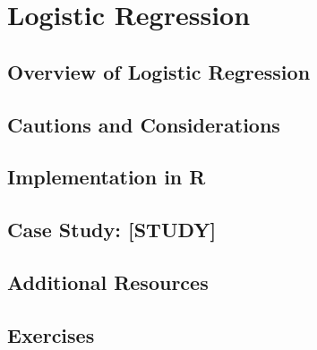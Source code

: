 
\chapter{Logistic Regression}

\section{Overview of Logistic Regression}

\section{Cautions and Considerations}

\section{Implementation in R}

\section{Case Study: [STUDY]}

\section{Additional Resources}

\section{Exercises}